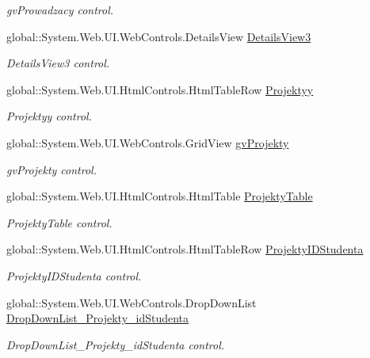 \begin{DoxyCompactItemize}
\begin{DoxyCompactList}\small\item\em gv\+Prowadzacy control. \end{DoxyCompactList}\item 
global\+::\+System.\+Web.\+U\+I.\+Web\+Controls.\+Details\+View \hyperlink{class_dziennik_ocen_web2_1_1_web_form1_a443cb784237ae454b881943bac17f87c}{Details\+View3}
\begin{DoxyCompactList}\small\item\em Details\+View3 control. \end{DoxyCompactList}\item 
global\+::\+System.\+Web.\+U\+I.\+Html\+Controls.\+Html\+Table\+Row \hyperlink{class_dziennik_ocen_web2_1_1_web_form1_abf93e1b3c58fc95ac0713ccadd807ef5}{Projektyy}
\begin{DoxyCompactList}\small\item\em Projektyy control. \end{DoxyCompactList}\item 
global\+::\+System.\+Web.\+U\+I.\+Web\+Controls.\+Grid\+View \hyperlink{class_dziennik_ocen_web2_1_1_web_form1_a75d645f4e2a139ccb924f8f131652e6d}{gv\+Projekty}
\begin{DoxyCompactList}\small\item\em gv\+Projekty control. \end{DoxyCompactList}\item 
global\+::\+System.\+Web.\+U\+I.\+Html\+Controls.\+Html\+Table \hyperlink{class_dziennik_ocen_web2_1_1_web_form1_a99d8f4908b7fce78eec0a83fa6752ad3}{Projekty\+Table}
\begin{DoxyCompactList}\small\item\em Projekty\+Table control. \end{DoxyCompactList}\item 
global\+::\+System.\+Web.\+U\+I.\+Html\+Controls.\+Html\+Table\+Row \hyperlink{class_dziennik_ocen_web2_1_1_web_form1_a32a9ef95539a282ca16273742f9e5b7e}{Projekty\+I\+D\+Studenta}
\begin{DoxyCompactList}\small\item\em Projekty\+I\+D\+Studenta control. \end{DoxyCompactList}\item 
global\+::\+System.\+Web.\+U\+I.\+Web\+Controls.\+Drop\+Down\+List \hyperlink{class_dziennik_ocen_web2_1_1_web_form1_a69b23baf7f1d15ffcf03150e8fa133bd}{Drop\+Down\+List\+\_\+\+Projekty\+\_\+id\+Studenta}
\begin{DoxyCompactList}\small\item\em Drop\+Down\+List\+\_\+\+Projekty\+\_\+id\+Studenta control. \end{DoxyCompactList}\item 

\end{DoxyCompactItemize}
